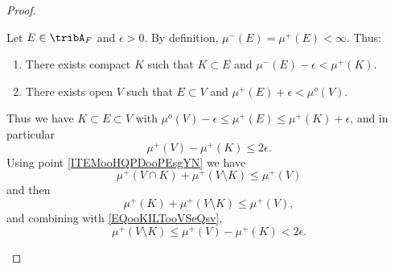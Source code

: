 \begin{proof}
\begin{subproof}
            Let \( E\in\tribA_F\) and \( \epsilon>0\). By definition, \( \mu^-(E)=\mu^+(E)<\infty\). Thus:
            \begin{enumerate}
                \item
                    There exists compact \( K\) such that \( K\subset E\) and \( \mu^-(E)-\epsilon<\mu^+(K)\).
                \item
                    There exists open \( V\) such that \( E\subset V\) and \( \mu^+(E)+\epsilon<\mu^o(V)\).
            \end{enumerate}
            Thus we have \( K\subset E\subset V\) with $\mu^o(V)-\epsilon\leq \mu^+(E)\leq \mu^+(K)+\epsilon$, and in particular
            \begin{equation}        \label{EQooKILTooVSeQsv}
                \mu^+(V)-\mu^+(K)\leq 2\epsilon.
            \end{equation}
            Using point \ref{ITEMooHQPDooPEsgYN} we have
            \begin{equation}
                \mu^+(V\cap K)+\mu^+(V\setminus K)\leq \mu^+(V)
            \end{equation}
            and then
            \begin{equation}
                \mu^+(K)+\mu^+(V\setminus K)\leq \mu^+(V),
            \end{equation}
            and combining with \eqref{EQooKILTooVSeQsv},
            \begin{equation}
                \mu^+(V\setminus K)\leq \mu^+(V)-\mu^+(K)<2\epsilon.
            \end{equation}

                 \label{ITEMooDSKEooPQmrcW}


\end{subproof}
\end{proof}
